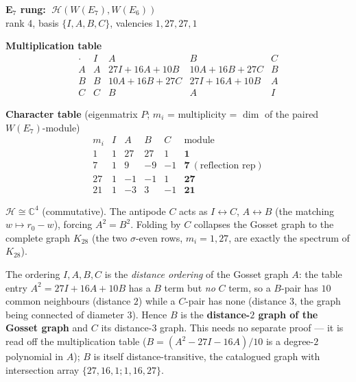 \documentclass[10pt]{article}
\begin{document}
\clearpage

\begin{center}{\Large\bfseries E$_7$ rung: $\ \mathcal H(W(E_7),W(E_6))$}\\[2pt]
{\small rank 4, basis $\{I,A,B,C\}$, valencies $1,27,27,1$}\end{center}
\vspace{10pt}

{\bfseries Multiplication table} 
\[
\renewcommand{\arraystretch}{1.4}
\begin{array}{c|cccc}
\cdot & I & A & B & C\\\hline
A & A & 27I{+}16A{+}10B & 10A{+}16B{+}27C & B\\
B & B & 10A{+}16B{+}27C & 27I{+}16A{+}10B & A\\
C & C & B & A & I
\end{array}
\]
\vspace{4pt}

{\bfseries Character table} (eigenmatrix $P$; $m_i$ = multiplicity = $\dim$ of
the paired $W(E_7)$-module)
\[
\renewcommand{\arraystretch}{1.25}
\begin{array}{c|cccc|l}
m_i & I & A & B & C & \text{module}\\\hline
1 & 1 & 27 & 27 & 1 & \mathbf 1\\
7 & 1 & 9 & -9 & -1 & \mathbf 7\ (\text{reflection rep})\\
27 & 1 & -1 & -1 & 1 & \mathbf{27}\\
21 & 1 & -3 & 3 & -1 & \mathbf{21}
\end{array}
\]
\vspace{2pt}

{\small $\mathcal H\cong\mathbb C^4$ (commutative). The antipode $C$ acts as
$I\!\leftrightarrow\!C$, $A\!\leftrightarrow\!B$ (the matching $w\mapsto r_0-w$),
forcing $A^2=B^2$. Folding by $C$ collapses the Gosset graph to the complete
graph $K_{28}$ (the two $\sigma$-even rows, $m_i=1,27$, are exactly the spectrum
of $K_{28}$).

\smallskip
The ordering $I,A,B,C$ is the \emph{distance ordering} of the Gosset graph
$A$: the table entry $A^2=27I+16A+10B$ has a $B$ term but \emph{no} $C$ term,
so a $B$-pair has $10$ common neighbours (distance $2$) while a $C$-pair has
none (distance $3$, the graph being connected of diameter $3$). Hence $B$ is the
\textbf{distance-$2$ graph of the Gosset graph} and $C$ its distance-$3$ graph.
This needs no separate proof --- it is read off the multiplication table
($B=(A^2-27I-16A)/10$ is a degree-$2$ polynomial in $A$); $B$ is itself
distance-transitive, the catalogued graph with intersection array
$\{27,16,1;1,16,27\}$.}
\end{document}
